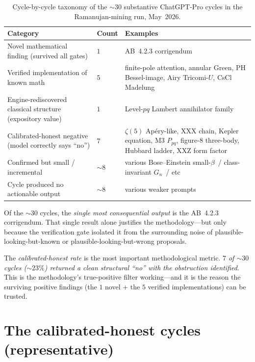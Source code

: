 \documentclass[11pt,reqno]{amsart}
\theoremstyle{definition}
\begin{document}
\begin{table}[h!]
\centering
\renewcommand{\arraystretch}{1.25}
\begin{tabular}{>{\raggedright\arraybackslash}p{}
                >{\centering\arraybackslash}p{}
                >{\raggedright\arraybackslash}p{}}
\toprule
\textbf{Category} & \textbf{Count} & \textbf{Examples} \\
\midrule
Novel mathematical finding (survived all gates) & $1$ &
AB~4.2.3 corrigendum \\
Verified implementation of known math & $5$ &
finite-pole attention, annular Green, PH Bessel-image, Airy
Tricomi-$U$, CsCl Madelung \\
Engine-rediscovered classical structure (expository value) & $1$ &
Level-$pq$ Lambert annihilator family \\
Calibrated-honest negative (model correctly says ``no'') & $7$ &
$\zeta(5)$ Ap\'ery-like, XXX chain, Kepler equation, M3 $P_{pq}$,
figure-8 three-body, Hubbard ladder, XXZ form factor \\
Confirmed but small / incremental & $\sim 8$ &
various Bose--Einstein small-$\beta$~/ class-invariant $G_n$~/ etc \\
Cycle produced no actionable output & $\sim 8$ &
various weaker prompts \\
\bottomrule
\end{tabular}
\caption{Cycle-by-cycle taxonomy of the $\sim 30$ substantive
ChatGPT-Pro cycles in the Ramanujan-mining run, May~2026.}
\label{tab:taxonomy}
\end{table}

Of the $\sim 30$ cycles, the \emph{single most consequential output}
is the AB~4.2.3 corrigendum. That single result alone justifies the
methodology---but only because the verification gate isolated it
from the surrounding noise of plausible-looking-but-known or
plausible-looking-but-wrong proposals.

The \emph{calibrated-honest rate} is the most important
methodological metric. \emph{$7$ of $\sim 30$ cycles (${\sim}23\%$)
returned a clean structural ``no'' with the obstruction identified.}
This is the methodology's true-positive filter working---and it is
the reason the surviving positive findings (the $1$ novel $+$ the
$5$ verified implementations) can be trusted.

\section{The calibrated-honest cycles (representative)}\label{sec:honest-cycles}
\end{document}
